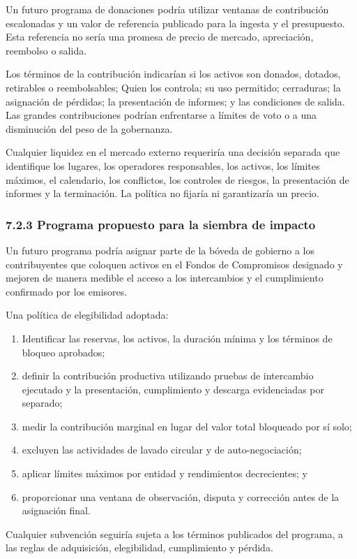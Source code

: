 \documentclass[11pt]{article}
\begin{document}
Un futuro programa de donaciones podría utilizar ventanas de contribución escalonadas y un valor de referencia publicado para la ingesta y el presupuesto. Esta referencia no sería una promesa de precio de mercado, apreciación, reembolso o salida.

Los términos de la contribución indicarían si los activos son donados, dotados, retirables o reembolsables; Quien los controla; su uso permitido; cerraduras; la asignación de pérdidas; la presentación de informes; y las condiciones de salida. Las grandes contribuciones podrían enfrentarse a límites de voto o a una disminución del peso de la gobernanza.

Cualquier liquidez en el mercado externo requeriría una decisión separada que identifique los lugares, los operadores responsables, los activos, los límites máximos, el calendario, los conflictos, los controles de riesgos, la presentación de informes y la terminación. La política no fijaría ni garantizaría un precio.

\subsubsection*{7.2.3 Programa propuesto para la siembra de impacto}

Un futuro programa podría asignar parte de la bóveda de gobierno a los contribuyentes que coloquen activos en el Fondos de Compromisos designado y mejoren de manera medible el acceso a los intercambios y el cumplimiento confirmado por los emisores.

Una política de elegibilidad adoptada:

\begin{enumerate}[leftmargin=*]
\item Identificar las reservas, los activos, la duración mínima y los términos de bloqueo aprobados;
\item definir la contribución productiva utilizando pruebas de intercambio ejecutado y la presentación, cumplimiento y descarga evidenciadas por separado;
\item medir la contribución marginal en lugar del valor total bloqueado por sí solo;
\item excluyen las actividades de lavado circular y de auto-negociación;
\item aplicar límites máximos por entidad y rendimientos decrecientes; y
\item proporcionar una ventana de observación, disputa y corrección antes de la asignación final.
\end{enumerate}
Cualquier subvención seguiría sujeta a los términos publicados del programa, a las reglas de adquisición, elegibilidad, cumplimiento y pérdida.
\end{document}
